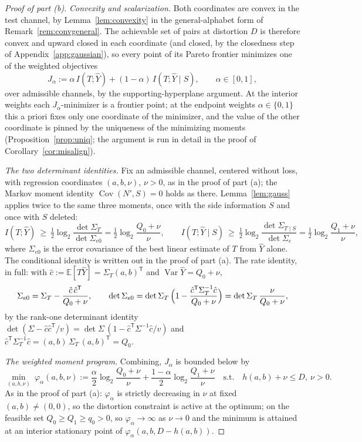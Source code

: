 \documentclass[11pt,onecolumn]{IEEEtran}
\newcommand{\E}{\mathbb{E}}
\newcommand{\Cov}{\operatorname{Cov}}
\newcommand{\hY}{\widehat{Y}}
\begin{document}
\begin{proof}[Proof of part (b)]
\emph{Convexity and scalarization.} Both coordinates are convex in the
test channel, by Lemma~\ref{lem:convexity} in the general-alphabet form
of Remark~\ref{rem:convgeneral}.
The achievable set of pairs at distortion $D$ is therefore convex and
upward closed in each coordinate (and closed, by the closedness step of
Appendix~\ref{app:gaussian}), so every point of its Pareto frontier
minimizes one of the weighted objectives
\[
J_\alpha:=\alpha\,I(T;\hY)+(1-\alpha)\,I(T;\hY\mid S),
\qquad\alpha\in[0,1],
\]
over admissible channels, by the supporting-hyperplane argument. At
the interior weights each $J_\alpha$-minimizer is a frontier point;
at the endpoint weights $\alpha\in\{0,1\}$ this a priori fixes only
one coordinate of the minimizer, and the value of the other
coordinate is pinned by the uniqueness of the minimizing moments
(Proposition~\ref{prop:uniq}; the argument is run in detail in the
proof of Corollary~\ref{cor:misalign}).

\emph{The two determinant identities.} Fix an admissible channel,
centered without loss, with regression coordinates $(a,b,\nu)$, $\nu>0$,
as in the proof of part (a); the Markov moment
identity $\Cov(N',S)=0$ holds as there. Lemma~\ref{lem:gauss} applies
twice to the same three moments, once with the side information $S$ and
once with $S$ deleted:
\begin{equation}
I(T;\hY)\ \ge\
\tfrac12\log_2\frac{\det\Sigma_T}{\det\Sigma_{e0}}
=\tfrac12\log_2\frac{Q_0+\nu}{\nu},
\qquad
I(T;\hY\mid S)\ \ge\
\tfrac12\log_2\frac{\det\Sigma_{T\mid S}}{\det\Sigma_{e}}
=\tfrac12\log_2\frac{Q_1+\nu}{\nu},
\label{eq:two-detids}
\end{equation}
where $\Sigma_{e0}$ is the error covariance of the best linear
estimate of $T$ from $\hY$ alone. The conditional identity is written
out in the proof of part (a). The rate identity, in
full: with $\hat c:=\E[T\hY]=\Sigma_T(a,b)^{\mathsf T}$ and
$\operatorname{Var}\hY=Q_0+\nu$,
\[
\Sigma_{e0}=\Sigma_T-\frac{\hat c\,\hat c^{\mathsf T}}{Q_0+\nu},
\qquad
\det\Sigma_{e0}
=\det\Sigma_T\,
\Bigl(1-\frac{\hat c^{\mathsf T}\Sigma_T^{-1}\hat c}{Q_0+\nu}\Bigr)
=\det\Sigma_T\,\frac{\nu}{Q_0+\nu},
\]
by the rank-one determinant identity
$\det(\Sigma-\hat c\hat c^{\mathsf T}/v)
=\det\Sigma\,(1-\hat c^{\mathsf T}\Sigma^{-1}\hat c/v)$ and
$\hat c^{\mathsf T}\Sigma_T^{-1}\hat c
=(a,b)\,\Sigma_T\,(a,b)^{\mathsf T}=Q_0$.

\emph{The weighted moment program.} Combining, $J_\alpha$ is bounded
below by
\begin{equation}
\min_{(a,b,\nu)}\ \varphi_\alpha(a,b,\nu):=
\frac\alpha2\log_2\frac{Q_0+\nu}{\nu}
+\frac{1-\alpha}2\log_2\frac{Q_1+\nu}{\nu}
\quad\text{s.t.}\quad h(a,b)+\nu\le D,\ \nu>0 .
\label{eq:weighted-program}
\end{equation}
As in the proof of part (a): $\varphi_\alpha$ is strictly
decreasing in $\nu$ at fixed $(a,b)\ne(0,0)$, so the distortion
constraint is active at the optimum; on the feasible set
$Q_0\ge Q_1\ge q_0>0$, so $\varphi_\alpha\to\infty$ as $\nu\to0$ and the
minimum is attained at an interior stationary point of
$\varphi_\alpha(a,b,D-h(a,b))$.


\end{proof}
\end{document}

